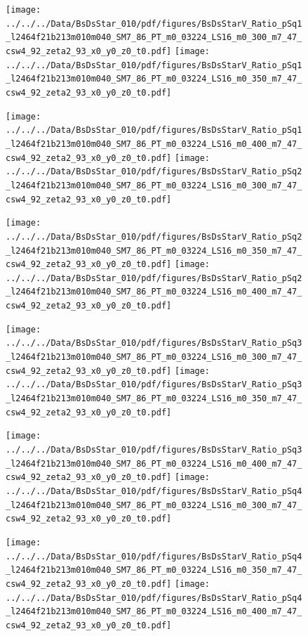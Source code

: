 \documentclass[a4paper,10pt]{article}
\begin{document}
\begin{figure}[p]
 \texttt{[image: ../../../Data/BsDsStar\_010/pdf/figures/BsDsStarV\_Ratio\_pSq1\_l2464f21b213m010m040\_SM7\_86\_PT\_m0\_03224\_LS16\_m0\_300\_m7\_47\_csw4\_92\_zeta2\_93\_x0\_y0\_z0\_t0.pdf]} 
 \texttt{[image: ../../../Data/BsDsStar\_010/pdf/figures/BsDsStarV\_Ratio\_pSq1\_l2464f21b213m010m040\_SM7\_86\_PT\_m0\_03224\_LS16\_m0\_350\_m7\_47\_csw4\_92\_zeta2\_93\_x0\_y0\_z0\_t0.pdf]} 
 \end{figure}
\begin{figure}[p]
 \texttt{[image: ../../../Data/BsDsStar\_010/pdf/figures/BsDsStarV\_Ratio\_pSq1\_l2464f21b213m010m040\_SM7\_86\_PT\_m0\_03224\_LS16\_m0\_400\_m7\_47\_csw4\_92\_zeta2\_93\_x0\_y0\_z0\_t0.pdf]} 
 \texttt{[image: ../../../Data/BsDsStar\_010/pdf/figures/BsDsStarV\_Ratio\_pSq2\_l2464f21b213m010m040\_SM7\_86\_PT\_m0\_03224\_LS16\_m0\_300\_m7\_47\_csw4\_92\_zeta2\_93\_x0\_y0\_z0\_t0.pdf]} 
 \end{figure}
\begin{figure}[p]
 \texttt{[image: ../../../Data/BsDsStar\_010/pdf/figures/BsDsStarV\_Ratio\_pSq2\_l2464f21b213m010m040\_SM7\_86\_PT\_m0\_03224\_LS16\_m0\_350\_m7\_47\_csw4\_92\_zeta2\_93\_x0\_y0\_z0\_t0.pdf]} 
 \texttt{[image: ../../../Data/BsDsStar\_010/pdf/figures/BsDsStarV\_Ratio\_pSq2\_l2464f21b213m010m040\_SM7\_86\_PT\_m0\_03224\_LS16\_m0\_400\_m7\_47\_csw4\_92\_zeta2\_93\_x0\_y0\_z0\_t0.pdf]} 
 \end{figure}
\clearpage
\begin{figure}[p]
 \texttt{[image: ../../../Data/BsDsStar\_010/pdf/figures/BsDsStarV\_Ratio\_pSq3\_l2464f21b213m010m040\_SM7\_86\_PT\_m0\_03224\_LS16\_m0\_300\_m7\_47\_csw4\_92\_zeta2\_93\_x0\_y0\_z0\_t0.pdf]} 
 \texttt{[image: ../../../Data/BsDsStar\_010/pdf/figures/BsDsStarV\_Ratio\_pSq3\_l2464f21b213m010m040\_SM7\_86\_PT\_m0\_03224\_LS16\_m0\_350\_m7\_47\_csw4\_92\_zeta2\_93\_x0\_y0\_z0\_t0.pdf]} 
 \end{figure}
\begin{figure}[p]
 \texttt{[image: ../../../Data/BsDsStar\_010/pdf/figures/BsDsStarV\_Ratio\_pSq3\_l2464f21b213m010m040\_SM7\_86\_PT\_m0\_03224\_LS16\_m0\_400\_m7\_47\_csw4\_92\_zeta2\_93\_x0\_y0\_z0\_t0.pdf]} 
 \texttt{[image: ../../../Data/BsDsStar\_010/pdf/figures/BsDsStarV\_Ratio\_pSq4\_l2464f21b213m010m040\_SM7\_86\_PT\_m0\_03224\_LS16\_m0\_300\_m7\_47\_csw4\_92\_zeta2\_93\_x0\_y0\_z0\_t0.pdf]} 
 \end{figure}
\begin{figure}[p]
 \texttt{[image: ../../../Data/BsDsStar\_010/pdf/figures/BsDsStarV\_Ratio\_pSq4\_l2464f21b213m010m040\_SM7\_86\_PT\_m0\_03224\_LS16\_m0\_350\_m7\_47\_csw4\_92\_zeta2\_93\_x0\_y0\_z0\_t0.pdf]} 
 \texttt{[image: ../../../Data/BsDsStar\_010/pdf/figures/BsDsStarV\_Ratio\_pSq4\_l2464f21b213m010m040\_SM7\_86\_PT\_m0\_03224\_LS16\_m0\_400\_m7\_47\_csw4\_92\_zeta2\_93\_x0\_y0\_z0\_t0.pdf]} 
 \end{figure}
\end{document}
